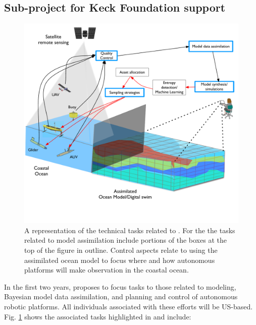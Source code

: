 \subsection{Sub-project for Keck Foundation support}

\begin{figure}[h!]
  \centering
  \includegraphics[scale=0.6]{fig/Audacious-pilot-block-diag-2.pdf}
  \caption{A representation of the technical tasks related to \proe. For
    the \kck the tasks related to model assimilation include portions of
    the boxes at the top of the figure in {\color{blue}{blue}}
    outline. Control aspects relate to using the assimilated ocean model
    to focus where and how autonomous platforms will make observation in
    the coastal ocean.}
    \label{fig:block-diag}
\end{figure}

In the first two years, \pro proposes to focus tasks to those related to modeling, Bayesian model data
assimilation, and planning and control of autonomous robotic platforms. All
individuals associated with these efforts will be US-based.
Fig. \ref{fig:block-diag} shows the associated tasks highlighted in
{\color{blue}{blue}} and include:

